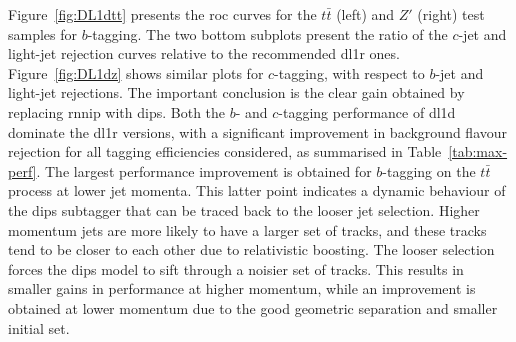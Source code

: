 Figure~\ref{fig:DL1dtt} presents the \gls{roc} curves for the $t\bar{t}$ (left) and $Z'$ (right) test samples for $b$-tagging. The two bottom subplots present the ratio of the $c$-jet and light-jet rejection curves relative to the recommended \gls{dl1r} ones. Figure~\ref{fig:DL1dz} shows similar plots for $c$-tagging, with respect to $b$-jet and light-jet rejections. The important conclusion is the clear gain obtained by replacing \gls{rnnip} with \gls{dips}. Both the $b$- and $c$-tagging performance of \gls{dl1d} dominate the \gls{dl1r} versions, with a significant improvement in background flavour rejection for all tagging efficiencies considered, as summarised in Table~\ref{tab:max-perf}. The largest performance improvement is obtained for $b$-tagging on the $t\bar{t}$ process at lower jet momenta. This latter point indicates a dynamic behaviour of the \gls{dips} subtagger that can be traced back to the looser jet selection. Higher momentum jets are more likely to have a larger set of tracks, and these tracks tend to be closer to each other due to relativistic boosting. The looser selection forces the \gls{dips} model to sift through a noisier set of tracks. This results in smaller gains in performance at higher momentum, while an improvement is obtained at lower momentum due to the good geometric separation and smaller initial set. 

